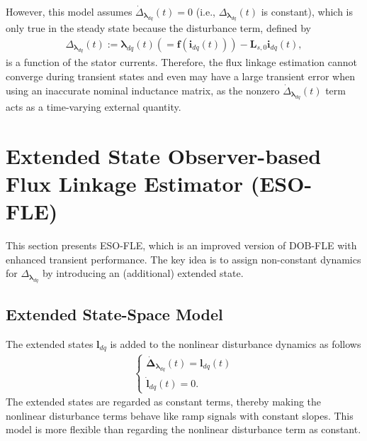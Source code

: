 \documentclass[conference]{IEEEtran}
\begin{document}
However, this model assumes $\dot \Delta_{\boldsymbol{\lambda}_{dq}}(t) = 0$ (i.e., $\Delta_{\boldsymbol{\lambda}_{dq}}(t)$ is constant), which is only true in the steady state because the disturbance term, defined by 
\begin{align}
\Delta_{\boldsymbol{\lambda}_{dq}}(t) := {\boldsymbol{\lambda}_{dq}}(t)(=\boldsymbol{f}({\boldsymbol{i}_{dq}}(t))) - {\boldsymbol{L}_{s,0}}{\boldsymbol{i}}_{dq}(t), 
\end{align}  
is a function of the stator currents. Therefore, the flux linkage estimation cannot converge during transient states and even may have a large transient error when using an inaccurate nominal inductance matrix, as the nonzero $\dot \Delta_{\boldsymbol{\lambda}_{dq}}(t)$ term acts as a time-varying external quantity.

\section{Extended State Observer-based Flux Linkage Estimator (ESO-FLE)}

This section presents ESO-FLE, which is an improved version of DOB-FLE with enhanced transient performance. The key idea is to assign non-constant dynamics for $\Delta_{\boldsymbol{\lambda}_{dq}}$ by introducing an (additional) extended state. 

\subsection{Extended State-Space Model}\label{subsec:dy_mdl}
%
The extended states $\boldsymbol{l}_{dq}$ is added to the nonlinear disturbance dynamics as follows  
    \begin{align}\label{eqn:rp_dob}
    \begin{cases}
    \boldsymbol{\dot \Delta}_{\boldsymbol{\lambda}_{dq}}(t) =     
    \boldsymbol{l}_{dq}(t) \\
      \boldsymbol{\dot l}_{dq}(t) = 0.
      \end{cases}
    \end{align} 
The extended states are regarded as constant terms, thereby making the nonlinear disturbance terms behave like ramp signals with constant slopes. This model is more flexible than regarding the nonlinear disturbance term as constant.
\end{document}
